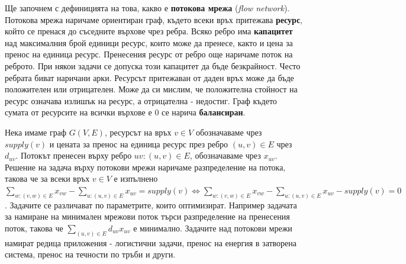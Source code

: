 \documentclass[a4paper,12pt]{article}
\begin{document}
\bigbreak

Ще започнем с дефиницията на това, какво е \textbf{потокова мрежа} (\textit{flow network}). Потокова мрежа наричаме ориентиран граф, където всеки връх притежава \textbf{ресурс}, който се пренася до съседните върхове чрез ребра. Всяко ребро има \textbf{капацитет} над максималния брой единици ресурс, които може да пренесе, както и цена за пренос на единица ресурс. Пренесения ресурс от ребро още наричаме поток на реброто. При някои задачи се допуска този капацитет да бъде безкрайност. Често ребрата биват наричани арки. Ресурсът притежаван от даден връх може да бъде положителен или отрицателен. Може да си мислим, че положителна стойност на ресурс означава излишък на ресурс, а отрицателна - недостиг. Граф където сумата от ресурсите на всички върхове е $0$ се нарича \textbf{балансиран}. 

\bigbreak

Нека имаме граф $G(V, E)$, ресурсът на връх $v \in V$ обозначаваме чрез $supply(v)$ и цената за пренос на единица ресурс през ребро $(u, v) \in E$ чрез $d_{uv}$. Потокът пренесен върху ребро $uv: (u, v) \in E$, обозначаваме чрез $x_{uv}$. Решение на задача върху потокови мрежи наричаме разпределение на потока, такова че за всеки връх $v \in V$ е изпълнено $\sum_{w: (v, w) \in E} x_{vw} - \sum_{u: (u, v) \in E} x_{uv} = supply(v) \iff \sum_{w: (v, w) \in E} x_{vw} - \sum_{u: (u, v) \in E} x_{uv} - supply(v) = 0$. Задачите се различават по параметрите, които оптимизират. Например задачата за намиране на минимален мрежови поток търси разпределение на пренесения поток, такова че $\sum_{(u, v) \in E} d_{uv} x_{uv}$ е минимално. Задачите над потокови мрежи намират редица приложения - логистични задачи, пренос на енергия в затворена система, пренос на течности по тръби и други.

\bigbreak
\end{document}
